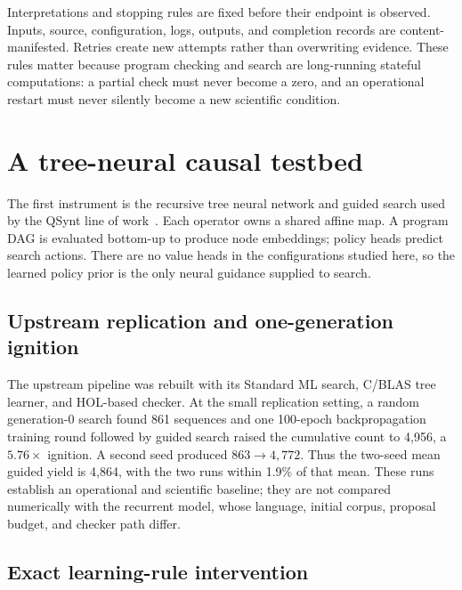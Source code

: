 \documentclass[11pt]{article}
\begin{document}
Interpretations and stopping rules are fixed before their endpoint is observed.  Inputs,
source, configuration, logs, outputs, and completion records are content-manifested.
Retries create new attempts rather than overwriting evidence.  These rules matter because
program checking and search are long-running stateful computations: a partial check must
never become a zero, and an operational restart must never silently become a new scientific
condition.

\section{A tree-neural causal testbed}
\label{sec:tree}

The first instrument is the recursive tree neural network and guided search used by the
QSynt line of work~\cite{gauthier2023}.  Each operator owns a shared affine map.  A program
DAG is evaluated bottom-up to produce node embeddings; policy heads predict search actions.
There are no value heads in the configurations studied here, so the learned policy prior
is the only neural guidance supplied to search.

\subsection{Upstream replication and one-generation ignition}

The upstream pipeline was rebuilt with its Standard ML search, C/BLAS tree learner, and
HOL-based checker.  At the small replication setting, a random generation-0 search found
861 sequences and one 100-epoch backpropagation training round followed by guided search
raised the cumulative count to 4,956, a $5.76\times$ ignition.  A second seed produced
$863\rightarrow4{,}772$.  Thus the two-seed mean guided yield is 4,864, with the two runs
within 1.9\% of that mean.  These runs establish an operational and scientific baseline;
they are not compared numerically with the recurrent model, whose language, initial corpus,
proposal budget, and checker path differ.

\subsection{Exact learning-rule intervention}
\label{sec:tree-rule}
\end{document}
